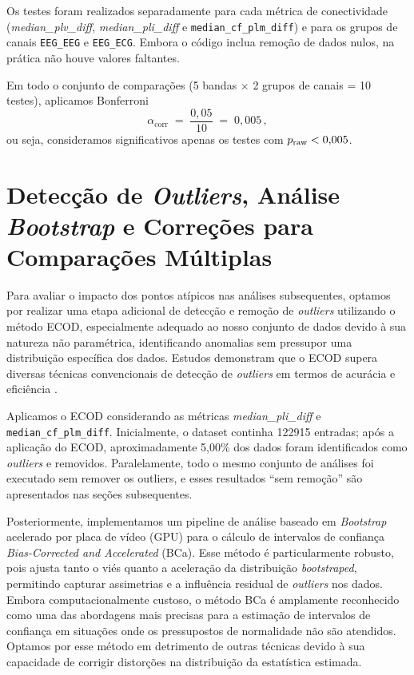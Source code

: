 Os testes foram realizados separadamente para cada métrica de conectividade (\textit{median\_plv\_diff}, \textit{median\_pli\_diff} e \texttt{median\_cf\_plm\_diff}) e para os grupos de canais \texttt{EEG\_EEG} e \texttt{EEG\_ECG}. Embora o código inclua remoção de dados nulos, na prática não houve valores faltantes.

Em todo o conjunto de comparações (5 bandas × 2 grupos de canais = 10 testes), aplicamos Bonferroni
\[ 
  \alpha_{\mathrm{corr}} \;=\; \frac{0{,}05}{10} \;=\; 0{,}005 \,,
\]
ou seja, consideramos significativos apenas os testes com \(p_{\rm raw}<0{,}005\).

\section{Detecção de \textit{Outliers}, Análise \textit{Bootstrap} e Correções para Comparações Múltiplas}
Para avaliar o impacto dos pontos atípicos nas análises subsequentes, optamos por realizar uma etapa adicional de detecção e remoção de \textit{outliers} utilizando o método ECOD, especialmente adequado ao nosso conjunto de dados devido à sua natureza não paramétrica, identificando anomalias sem pressupor uma distribuição específica dos dados. Estudos demonstram que o ECOD supera diversas técnicas convencionais de detecção de \textit{outliers} em termos de acurácia e eficiência \cite{li2022ecod}.

Aplicamos o ECOD considerando as métricas \textit{median\_pli\_diff} e \texttt{median\_cf\_plm\_diff}. Inicialmente, o dataset continha 122915 entradas; após a aplicação do ECOD, aproximadamente 5,00\% dos dados foram identificados como \textit{outliers} e removidos. Paralelamente, todo o mesmo conjunto de análises foi executado sem remover os outliers, e esses resultados ``sem remoção'' são apresentados nas seções subsequentes.

Posteriormente, implementamos um pipeline de análise baseado em \textit{Bootstrap} acelerado por placa de vídeo (GPU) para o cálculo de intervalos de confiança \textit{Bias-Corrected and Accelerated} (BCa). Esse método é particularmente robusto, pois ajusta tanto o viés quanto a aceleração da distribuição \textit{bootstraped}, permitindo capturar assimetrias e a influência residual de \textit{outliers} nos dados. Embora computacionalmente custoso, o método BCa é amplamente reconhecido como uma das abordagens mais precisas para a estimação de intervalos de confiança em situações onde os pressupostos de normalidade não são atendidos. Optamos por esse método em detrimento de outras técnicas devido à sua capacidade de corrigir distorções na distribuição da estatística estimada.

